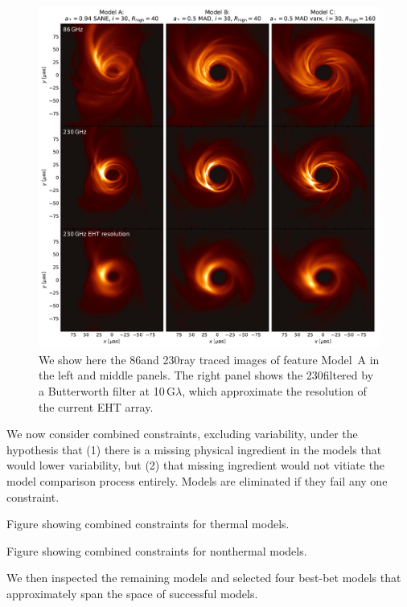 
\begin{figure}
  \centering
  \includegraphics[width=\textwidth]{figures/bestbet_imgs.pdf}
  \caption{We show here the 86\GHz and 230\GHz ray traced images of
    feature Model~A in the left and middle panels.
    The right panel shows the 230\GHz filtered by a Butterworth filter
    at 10$\,\mathrm{G}\lambda$, which approximate the resolution of
    the current EHT array.}
  \label{fig:bestbet_imgs}
\end{figure}

We now consider combined constraints, excluding variability, under the
hypothesis that (1) there is a missing physical ingredient in the
models that would lower variability, but (2) that missing ingredient
would not vitiate the model comparison process entirely.
Models are eliminated if they fail any one constraint.

\citep{2020arXiv200406210P}

Figure showing combined constraints for thermal models.

Figure showing combined constraints for nonthermal models.

We then inspected the remaining models and selected four best-bet
models that approximately span the space of successful models.

